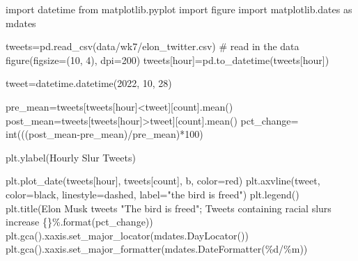 \documentclass[
  letterpaper,
  DIV=11,
  numbers=noendperiod]{scrreprt}
\newenvironment{Shaded}{\begin{snugshade}}{\end{snugshade}}
\newcommand{\BuiltInTok}[1]{\textcolor[rgb]{0.00,0.23,0.31}{#1}}
\newcommand{\CommentTok}[1]{\textcolor[rgb]{0.37,0.37,0.37}{#1}}
\newcommand{\DecValTok}[1]{\textcolor[rgb]{0.68,0.00,0.00}{#1}}
\newcommand{\ImportTok}[1]{\textcolor[rgb]{0.00,0.46,0.62}{#1}}
\newcommand{\NormalTok}[1]{\textcolor[rgb]{0.00,0.23,0.31}{#1}}
\newcommand{\OperatorTok}[1]{\textcolor[rgb]{0.37,0.37,0.37}{#1}}
\newcommand{\SpecialCharTok}[1]{\textcolor[rgb]{0.37,0.37,0.37}{#1}}
\newcommand{\StringTok}[1]{\textcolor[rgb]{0.13,0.47,0.30}{#1}}
\begin{document}
\begin{Shaded}
\begin{Highlighting}[]
\ImportTok{import}\NormalTok{ datetime}
\ImportTok{from}\NormalTok{ matplotlib.pyplot }\ImportTok{import}\NormalTok{ figure}
\ImportTok{import}\NormalTok{ matplotlib.dates }\ImportTok{as}\NormalTok{ mdates}

\NormalTok{tweets}\OperatorTok{=}\NormalTok{pd.read\_csv(}\StringTok{\textquotesingle{}data/wk7/elon\_twitter.csv\textquotesingle{}}\NormalTok{) }\CommentTok{\# read in the data}
\NormalTok{figure(figsize}\OperatorTok{=}\NormalTok{(}\DecValTok{10}\NormalTok{, }\DecValTok{4}\NormalTok{), dpi}\OperatorTok{=}\DecValTok{200}\NormalTok{)}
\NormalTok{tweets[}\StringTok{\textquotesingle{}hour\textquotesingle{}}\NormalTok{]}\OperatorTok{=}\NormalTok{pd.to\_datetime(tweets[}\StringTok{\textquotesingle{}hour\textquotesingle{}}\NormalTok{])}

\NormalTok{tweet}\OperatorTok{=}\NormalTok{datetime.datetime(}\DecValTok{2022}\NormalTok{, }\DecValTok{10}\NormalTok{, }\DecValTok{28}\NormalTok{)}

\NormalTok{pre\_mean}\OperatorTok{=}\NormalTok{tweets[tweets[}\StringTok{\textquotesingle{}hour\textquotesingle{}}\NormalTok{]}\OperatorTok{\textless{}}\NormalTok{tweet][}\StringTok{\textquotesingle{}count\textquotesingle{}}\NormalTok{].mean()}
\NormalTok{post\_mean}\OperatorTok{=}\NormalTok{tweets[tweets[}\StringTok{\textquotesingle{}hour\textquotesingle{}}\NormalTok{]}\OperatorTok{\textgreater{}}\NormalTok{tweet][}\StringTok{\textquotesingle{}count\textquotesingle{}}\NormalTok{].mean()}
\NormalTok{pct\_change}\OperatorTok{=} \BuiltInTok{int}\NormalTok{(((post\_mean}\OperatorTok{{-}}\NormalTok{pre\_mean)}\OperatorTok{/}\NormalTok{pre\_mean)}\OperatorTok{*}\DecValTok{100}\NormalTok{)}

\NormalTok{plt.ylabel(}\StringTok{\textquotesingle{}Hourly Slur Tweets\textquotesingle{}}\NormalTok{)}

\NormalTok{plt.plot\_date(tweets[}\StringTok{\textquotesingle{}hour\textquotesingle{}}\NormalTok{], tweets[}\StringTok{\textquotesingle{}count\textquotesingle{}}\NormalTok{], }\StringTok{\textquotesingle{}b\textquotesingle{}}\NormalTok{, color}\OperatorTok{=}\StringTok{\textquotesingle{}red\textquotesingle{}}\NormalTok{)}
\NormalTok{plt.axvline(tweet, color}\OperatorTok{=}\StringTok{\textquotesingle{}black\textquotesingle{}}\NormalTok{, linestyle}\OperatorTok{=}\StringTok{\textquotesingle{}dashed\textquotesingle{}}\NormalTok{, label}\OperatorTok{=}\StringTok{\textquotesingle{}"the bird is freed"\textquotesingle{}}\NormalTok{)}
\NormalTok{plt.legend()}
\NormalTok{plt.title(}\StringTok{\textquotesingle{}Elon Musk tweets "The bird is freed"; Tweets containing racial slurs increase }\SpecialCharTok{\{\}}\StringTok{\%\textquotesingle{}}\NormalTok{.}\BuiltInTok{format}\NormalTok{(pct\_change))}
\NormalTok{plt.gca().xaxis.set\_major\_locator(mdates.DayLocator())}
\NormalTok{plt.gca().xaxis.set\_major\_formatter(mdates.DateFormatter(}\StringTok{\textquotesingle{}}\SpecialCharTok{\%d}\StringTok{/\%m\textquotesingle{}}\NormalTok{))}
\end{Highlighting}
\end{Shaded}
\end{document}
